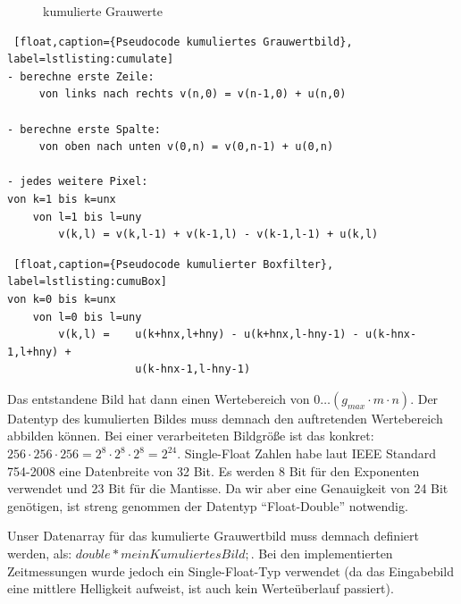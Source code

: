 \documentclass[a4paper,12pt]{article}
\begin{document}
\begin{figure}[htbp]
\caption{kumulierte Grauwerte}%
\label{figure_kumuliert}
\end{figure}


\begin{lstlisting} [float,caption={Pseudocode kumuliertes Grauwertbild},
label=lstlisting:cumulate]
- berechne erste Zeile:
	 von links nach rechts v(n,0) = v(n-1,0) + u(n,0)
	 
- berechne erste Spalte:
	 von oben nach unten v(0,n) = v(0,n-1) + u(0,n)
	
- jedes weitere Pixel:
von k=1 bis k=unx
	von l=1 bis l=uny 
		v(k,l) = v(k,l-1) + v(k-1,l) - v(k-1,l-1) + u(k,l)
\end{lstlisting}


\begin{lstlisting} [float,caption={Pseudocode kumulierter Boxfilter},
label=lstlisting:cumuBox]
von k=0 bis k=unx
	von l=0 bis l=uny 
		v(k,l) = 	u(k+hnx,l+hny) - u(k+hnx,l-hny-1) - u(k-hnx-1,l+hny) +
					u(k-hnx-1,l-hny-1)
\end{lstlisting}


Das entstandene Bild hat dann einen Wertebereich von 
$0 \ldots (g_{max} \cdot m \cdot n)$. Der Datentyp des kumulierten Bildes muss
demnach den auftretenden Wertebereich abbilden können. Bei einer verarbeiteten Bildgröße ist
das konkret: $256 \cdot 256 \cdot 256 = 2^{8} \cdot 2^{8} \cdot 2^{8} = 2^{24}$.
Single-Float Zahlen habe laut IEEE Standard 754-2008 eine Datenbreite von 32
Bit. Es werden 8 Bit für den Exponenten verwendet und 23 Bit für die Mantisse.
Da wir aber eine Genauigkeit von 24 Bit genötigen, ist streng
genommen der Datentyp "`Float-Double"' notwendig. 

Unser Datenarray für das kumulierte Grauwertbild muss demnach definiert
werden, als: $double* meinKumuliertesBild;$. Bei den implementierten
Zeitmessungen wurde jedoch ein Single-Float-Typ verwendet (da das Eingabebild
eine mittlere Helligkeit aufweist, ist auch kein Werteüberlauf passiert).
\end{document}
